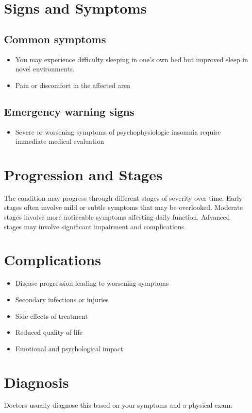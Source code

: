 \section{Signs and Symptoms}
\subsection{Common symptoms}
\begin{itemize}[noitemsep]
  \item You may experience difficulty sleeping in one's own bed but improved sleep in novel environments.
  \item Pain or discomfort in the affected area
  \end{itemize}
\subsection{Emergency warning signs}
\begin{itemize}[noitemsep]
  \item Severe or worsening symptoms of psychophysiologic insomnia require immediate medical evaluation
\end{itemize}
\section{Progression and Stages}
The condition may progress through different stages of severity over time. Early stages often involve mild or subtle symptoms that may be overlooked. Moderate stages involve more noticeable symptoms affecting daily function. Advanced stages may involve significant impairment and complications.
\section{Complications}
\begin{itemize}[noitemsep]
  \item Disease progression leading to worsening symptoms
  \item Secondary infections or injuries
  \item Side effects of treatment
  \item Reduced quality of life
  \item Emotional and psychological impact
\end{itemize}
\section{Diagnosis}
Doctors usually diagnose this based on your symptoms and a physical exam.


